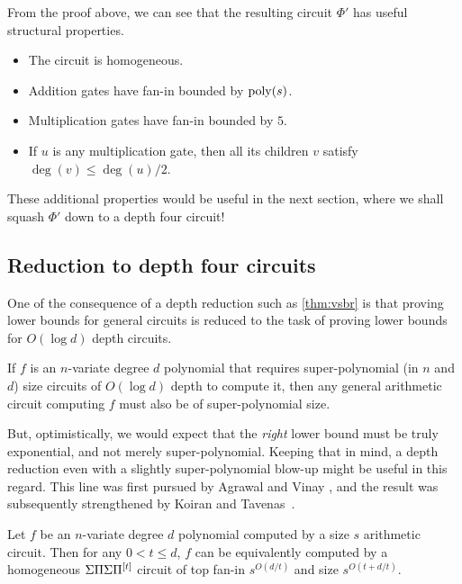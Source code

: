 \begin{remark}\label{remark:vsbr}
From the proof above, we can see that the resulting circuit $\Phi'$ has useful structural properties. 
\begin{itemize}
  \item The circuit is homogeneous. 
  \item Addition gates have fan-in bounded by $\mathrm{poly}(s)$. 
  \item Multiplication gates have fan-in bounded by $5$. 
  \item If $u$ is any multiplication gate, then all its children $v$ satisfy $\deg(v)\leq \deg(u)/2$. 
\end{itemize}
\end{remark}

These additional properties would be useful in the next section, where we shall squash $\Phi'$ down to a depth four circuit!

\subsection{Reduction to depth four circuits}

One of the consequence of a depth reduction such as \autoref{thm:vsbr} is that proving lower bounds for general circuits is reduced to the task of proving lower bounds for $O(\log d)$ depth circuits. 

\begin{corollary}\label{cor:vsbr-contra}
If $f$ is an $n$-variate degree $d$ polynomial that requires super-polynomial (in $n$ and $d$) size circuits of $O(\log d)$ depth to compute it, then any general arithmetic circuit computing $f$ must also be of super-polynomial size. 
\end{corollary}

But, optimistically, we would expect that the \emph{right} lower bound must be truly exponential, and not merely super-polynomial. Keeping that in mind, a depth reduction even with a slightly super-polynomial blow-up might be useful in this regard. This line was first pursued by Agrawal and Vinay \cite{av08}, and the result was subsequently strengthened by Koiran \cite{koiran} and Tavenas~\cite{Tav13}. 

\begin{theorem} \label{thm:av}
Let $f$ be an $n$-variate degree $d$ polynomial computed by a size $s$ arithmetic circuit. Then for any $0< t \leq d$, $f$ can be equivalently computed by a homogeneous $\Sigma\Pi\Sigma\Pi^{[t]}$ circuit of top fan-in $s^{O(d/t)}$ and size $s^{O(t + d/t)}$. 
\end{theorem}


